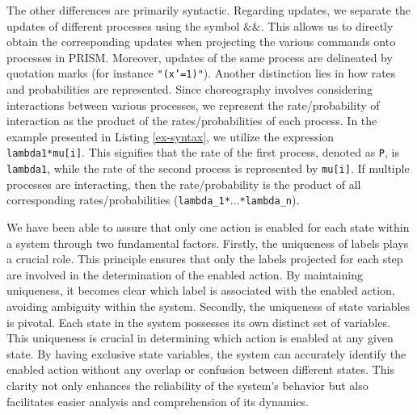 The other differences are primarily syntactic. Regarding updates, we separate the updates of different processes using the symbol \textcolor{sh_keyword}{$\texttt{\&\&}$}. This allows us to directly obtain the corresponding updates when projecting the various commands onto processes in PRISM. Moreover, updates of the same process are delineated by quotation marks (for instance \texttt{"(x'=1)"}). Another distinction lies in how rates and probabilities are represented. Since choreography involves considering interactions between various processes, we represent the rate/probability of interaction as the product of the rates/probabilities of each process. In the example presented in Listing \ref{ex-syntax}, we utilize the expression \texttt{lambda1*mu[i]}. This signifies that the rate of the first process, denoted as \texttt{P}, is \texttt{lambda1}, while the rate of the second process is represented by \texttt{mu[i]}. If multiple processes are interacting, then the rate/probability is the product of all corresponding rates/probabilities (\texttt{lambda\_1*$\ldots$*lambda\_n}).

We have been able to assure that only one action is enabled for each state within a system through two fundamental factors. Firstly, the uniqueness of labels plays a crucial role. This principle ensures that only the labels projected for each step are involved in the determination of the enabled action. By maintaining uniqueness, it becomes clear which label is associated with the enabled action, avoiding ambiguity within the system.
Secondly, the uniqueness of state variables is pivotal. Each state in the system possesses its own distinct set of variables. This uniqueness is crucial in determining which action is enabled at any given state. By having exclusive state variables, the system can accurately identify the enabled action without any overlap or confusion between different states. This clarity not only enhances the reliability of the system's behavior but also facilitates easier analysis and comprehension of its dynamics.